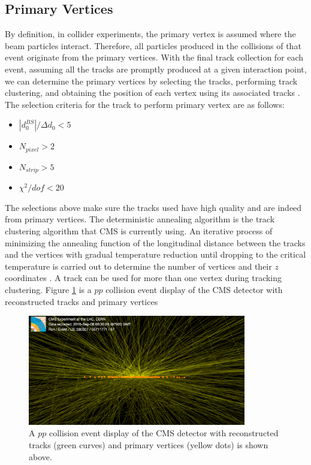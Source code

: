 \subsection{Primary Vertices}

By definition, in collider experiments, the primary vertex is assumed where the beam particles interact. Therefore, all particles produced in the collisions of that event originate from the primary vertices. With the final track collection for each event, assuming all the tracks are promptly produced at a given interaction point, we can determine the primary vertices by selecting the tracks, performing track clustering, and obtaining the position of each vertex using its associated tracks \cite{CMSTrackComp}. The selection criteria for the track to perform primary vertex are as follows:

\begin{itemize}
\item $|d_0^{BS}|/ \Delta d_0 < 5$
\item $N_{pixel} > 2$
\item $N_{strip} > 5$
\item $\chi^2/dof < 20$
\end{itemize}



The selections above make sure the tracks used have high quality and are indeed from primary vertices. The deterministic annealing algorithm \cite{DAAlgo} is the track clustering algorithm that CMS is currently using. An iterative process of minimizing the annealing function of the longitudinal distance between the tracks and the vertices with gradual temperature reduction until dropping to the critical temperature is carried out to determine the number of vertices and their $z$ coordinates \cite{CMSTrackComp}. A track can be used for more than one vertex during tracking clustering. Figure \ref{CMSEvtDisplay} is a $pp$ collision event display of the CMS detector with reconstructed tracks and primary vertices 

\begin{figure}[hbtp]
\begin{center}
\includegraphics[width=0.85\textwidth]{Figures/Chapter4/CMSEvtDisplay.png}
\caption{A $pp$ collision event display of the CMS detector with reconstructed tracks (green curves) and primary vertices (yellow dots) is shown above.}
\label{CMSEvtDisplay}
\end{center}
\end{figure} 

